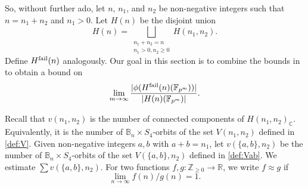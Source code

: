 \documentclass{amsart}
\numberwithin{equation}{section} \numberwithin{figure}{section}
\newcommand\FF{\mathbb{F}}
\newcommand\ZZ{\mathbb{Z}}
\newcommand\RR{\mathbb{R}}
\newcommand\CC{\mathbb{C}}
\theoremstyle{one}
\theoremstyle{definition}
\begin{document}
So, without further ado, let \(n\), \(n_1\), and \(n_2\) be non-negative integers such that \(n = n_1+n_2\) and \(n_1 > 0\).
Let \(H(n)\) be the disjoint union
\begin{equation}\label{eq:disjoint}
    H(n) =  \bigsqcup_{\substack{n_1+n_2 = n \\ n_1 > 0, n_2 \geq 0}} H(n_1,n_2).
\end{equation} 
Define \(H^{\rm fail}(n)\) analogously.
Our goal in this section is to combine the bounds in  to obtain a bound on 
\[ \lim_{m \to \infty} \frac{|\phi(H^{\rm fail}(n)(\FF_{p^m}))|}{|H(n)(\FF_{p^m})|}.\]

Recall that \(v(n_1,n_2)\) is the number of connected components of \(H(n_1,n_2)_{\CC}\).
Equivalently, it is the number of \({\mathbb{B}_n} \times S_4\)-orbits of the set \(V(n_1,n_2)\) defined in \eqref{def:V}.
Given non-negative integers \(a, b\) with \(a+b = n_1\), let \(v(\{a,b\},n_2)\) be the number of \({\mathbb{B}_n} \times S_4\)-orbits of the set \(V(\{a,b\},n_2)\) defined in \eqref{def:Vab}. 
We estimate \(\sum v(\{a,b\},n_2)\).
For two functions \(f,g \colon \ZZ_{\geq 0} \to \RR\), we write \(f \approx g\) if \[\lim_{n \to \infty} f(n)/g(n) = 1.\]
\end{document}
